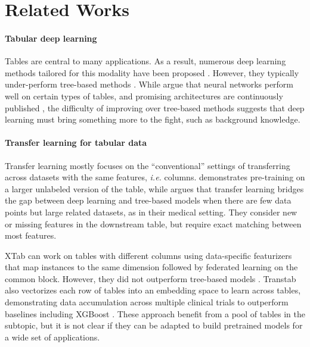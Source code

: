 \documentclass{article}
\theoremstyle{plain}
\theoremstyle{definition}
\theoremstyle{remark}
\begin{document}
\section{Related Works}\label{sec:related}

\paragraph{Tabular deep learning}
Tables are central to many applications. As a result, numerous deep learning methods tailored for this modality have been proposed \citep{abutbulDNFNetNeuralArchitecture2020a, arikTabNetAttentiveInterpretable2020,popovNeuralObliviousDecision2019, gorishniyRevisitingDeepLearning2023, somepalliSAINTImprovedNeural2021a}. However, they typically under-perform tree-based methods \citep{grinsztajnWhyTreebasedModels2022, shwartz-zivTabularDataDeep2021b,gardnerSubgroupRobustnessGrows2022}. While \citet{mcelfreshWhenNeuralNets2023} argue that neural networks perform well on certain types of tables, and promising architectures are continuously published \citep{gorishniyTabRTabularDeep2023, chenExcelFormerNeuralNetwork2023}, the difficulty of improving over tree-based methods suggests that deep learning must bring something more to the fight, such as background knowledge.

\paragraph{Transfer learning for tabular data} 
Transfer learning mostly focuses on the ``conventional'' settings of transferring across datasets with the same features, \emph{i.e.} columns. \citet{somepalliSAINTImprovedNeural2021a} demonstrates pre-training on a larger unlabeled version of the table, while \citet{levinTransferLearningDeep2023} argues that transfer learning bridges the gap between deep learning and tree-based models when there are few data points but large related datasets, as in their medical setting. They consider new or missing features in the downstream table, but require exact matching between most features.
 
XTab \citep{zhu2023xtab} can work on tables with different columns using data-specific featurizers that map instances to the same dimension followed by federated learning on the common block. However, they did not outperform tree-based models \citep[CatBoost,][]{dorogushCatboost2018}.
Transtab \citep{wang2022transtab} also vectorizes each row of tables into an embedding space to learn across tables, demonstrating data accumulation across multiple clinical trials to outperform baselines including XGBoost \citep{chen2016xgboost}. These approach benefit from a pool of tables in the subtopic, but it is not clear if they can be adapted to build pretrained models for a wide set of applications.
\end{document}
